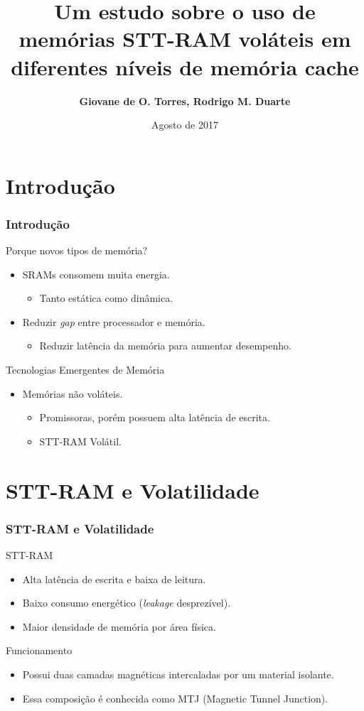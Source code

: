 \documentclass[10pt, pdf,xcolor=pdftex,dvipsnames,table]{beamer}
\title{Um estudo sobre o uso de memórias STT-RAM voláteis em diferentes níveis de memória cache}
\author[]{\textbf{Giovane de O. Torres\inst{1}, Rodrigo M. Duarte\inst{1}}\\
}
\institute{Pós-Graduação em Computação \\ Universidade Federal de Pelotas \\
\url{} 
}
\date{Agosto de 2017}
\begin{document}
\frame{\titlepage}
\frame{\tableofcontents}


\section{Introdução}

\frame
{
\frametitle{Introdução}
		\begin{block}{Porque novos tipos de memória?}
			\begin{itemize}
				\item SRAMs consomem muita energia.
				\begin{itemize}
					\item Tanto estática como dinâmica.
				\end{itemize}
				\item Reduzir \textit{gap} entre processador e memória.
				\begin{itemize}
					\item Reduzir latência da memória para aumentar desempenho.
				\end{itemize}
			\end{itemize}	 
		\end{block}
		\begin{block}{Tecnologias Emergentes de Memória}
			\begin{itemize}
				\item Memórias não voláteis.
				\begin{itemize}
					\item Promissoras, porém possuem alta latência de escrita.
					\item STT-RAM Volátil.
				\end{itemize}
			\end{itemize}	 
		\end{block}
}

\section{STT-RAM e Volatilidade}

\frame
{
\frametitle{STT-RAM e Volatilidade}
		\begin{block}{STT-RAM}
			\begin{itemize}
				\item Alta latência de escrita e baixa de leitura.
				\item Baixo consumo energético (\textit{leakage} desprezível).
				\item Maior densidade de memória por área física.
			\end{itemize}	 
		\end{block}
		\begin{block}{Funcionamento}
			\begin{itemize}
				\item Possui duas camadas magnéticas intercaladas por um material isolante.
				\item Essa composição é conhecida como MTJ (Magnetic Tunnel Junction).
			\end{itemize}	 
		\end{block}
}
\end{document}

